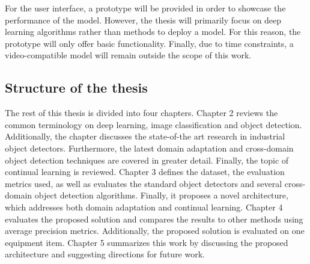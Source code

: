 For the user interface, a prototype will be provided in order to showcase the performance of the model. However, the thesis will primarily focus on deep learning algorithms rather than methods to deploy a model. For this reason, the prototype will only offer basic functionality. Finally, due to time constraints, a video-compatible model will remain outside the scope of this work. 



\subsection{Structure of the thesis}
The rest of this thesis is divided into four chapters. Chapter 2 reviews the common terminology on deep learning, image classification and object detection. Additionally, the chapter discusses the state-of-the art research in industrial object detectors. Furthermore, the latest domain adaptation and cross-domain object detection techniques are covered in greater detail. Finally, the topic of continual learning is reviewed. Chapter 3 defines the dataset, the evaluation metrics used, as well as evaluates the standard object detectors and several cross-domain object detection algorithms. Finally, it proposes a novel architecture, which addresses both domain adaptation and continual learning. Chapter 4 evaluates the proposed solution and compares the results to other methods using average precision metrics. Additionally, the proposed solution is evaluated on one equipment item. Chapter 5 summarizes this work by discussing the proposed architecture and suggesting directions for future work.

\clearpage